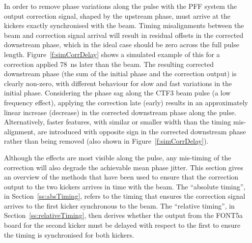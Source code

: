 In order to remove phase variations along the pulse with the PFF system the output correction signal, shaped by the upstream phase, must arrive at the kickers exactly synchronised with the beam. Timing misalignments between the beam and correction signal arrival will result in residual offsets in the corrected downstream phase, which in the ideal case should be zero across the full pulse length. 
Figure~\ref{f:simCorrDelay} shows a simulated example of this for a correction applied 78~ns later than the beam. The resulting corrected downstream phase (the sum of the initial phase and the correction output) is clearly non-zero, with different behaviour for slow and fast variations in the initial phase. Considering the phase sag along the CTF3 beam pulse (a low frequency effect), applying the correction late (early) results in an approximately linear increase (decrease) in the corrected downstream phase along the pulse. Alternatively, faster features, with similar or smaller width than the timing mis-alignment, are introduced with opposite sign in the corrected downstream phase rather than being removed (also shown in Figure~\ref{f:simCorrDelay}).



Although the effects are most visible along the pulse, any mis-timing of the correction will also degrade the achievable mean phase jitter. This section gives an overview of the methods that have been used to ensure that the correction output to the two kickers arrives in time with the beam. The ``absolute timing'', in Section~\ref{ss:absTiming}, refers to the timing that ensures the correction signal arrives to the first kicker synchronous to the beam. The ``relative timing'', in Section~\ref{ss:relativeTiming}, then derives whether the output from the FONT5a board for the second kicker must be delayed with respect to the first to ensure the timing is synchronised for both kickers.

